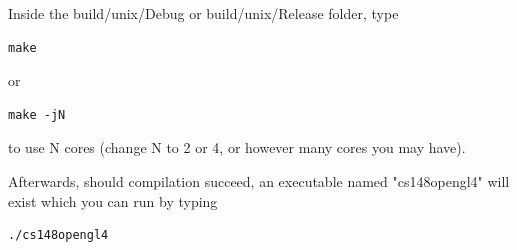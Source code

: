 \documentclass{article}
\begin{document}
Inside the build/unix/Debug or build/unix/Release folder, type

\begin{lstlisting}
make
\end{lstlisting}

or 

\begin{lstlisting}
make -jN
\end{lstlisting}

to use N cores (change N to 2 or 4, or however many cores you may have).

Afterwards, should compilation succeed, an executable named "cs148opengl4" will exist which you can run by typing 

\begin{lstlisting}
./cs148opengl4
\end{lstlisting}
\end{document}
